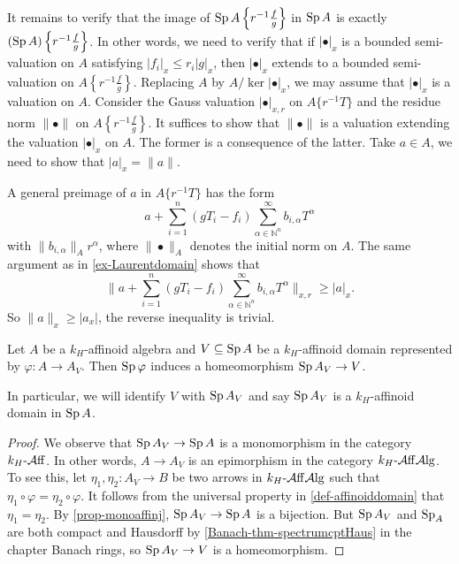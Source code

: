 \begin{example}
    It remains to verify that the image of $\operatorname{Sp} A\left\{r^{-1}\frac{f}{g}\right\}$ in $\operatorname{Sp} A$ is exactly $(\operatorname{Sp} A)\left\{r^{-1}\frac{f}{g}\right\}$. In other words, we need to verify that if $|\bullet|_x$ is a bounded semi-valuation on $A$ satisfying $|f_i|_x\leq r_i |g|_x$, then $|\bullet|_x$ extends to a bounded semi-valuation on   $A\left\{r^{-1}\frac{f}{g}\right\}$. 
    Replacing $A$ by $A/\ker |\bullet|_x$, we may assume that $|\bullet|_x$ is a valuation on $A$. Consider the Gauss valuation $|\bullet|_{x,r}$ on $A\{r^{-1}T\}$ and the residue norm $\|\bullet\|$ on $A\left\{r^{-1}\frac{f}{g}\right\}$. It suffices to show that $\|\bullet\|$ is a valuation extending the valuation $|\bullet|_x$ on $A$. The former is a consequence of the latter. Take $a\in A$, we need to show that $|a|_x=\|a\|$.

    A general preimage of $a$ in $A\{r^{-1}T\}$ has the form
    \[
        a+\sum_{i=1}^n(gT_i-f_i)\sum_{\alpha\in \mathbb{N}^n}^{\infty}b_{i,\alpha}T^{\alpha}
    \]
    with $\|b_{i,\alpha}\|_Ar^{\alpha}$, where $\|\bullet\|_A$ denotes the initial norm on $A$. The same argument as in \cref{ex-Laurentdomain} shows that 
    \[
        \|a+\sum_{i=1}^n(gT_i-f_i)\sum_{\alpha\in \mathbb{N}^n}^{\infty}b_{i,\alpha}T^{\alpha}\|_{x,r}\geq |a|_x.
    \]
    So $\|a\|_x\geq |a_x|$, the reverse inequality is trivial. 
\end{example}




\begin{proposition}\label{prop-affdomainhoemo}
    Let $A$ be a $k_H$-affinoid algebra and $V\subseteq \operatorname{Sp} A$ be a $k_H$-affinoid domain represented by $\varphi:A\rightarrow A_V$. Then $\operatorname{Sp} \varphi$ induces a homeomorphism $\operatorname{Sp} A_V\rightarrow V$. 
\end{proposition}
In particular, we will identify $V$ with $\operatorname{Sp} A_V$ and say $\operatorname{Sp} A_V$ is a $k_H$-affinoid domain in $\operatorname{Sp} A$.
\begin{proof}
    We observe that $\operatorname{Sp} A_V\rightarrow \operatorname{Sp} A$ is a monomorphism in the category $k_H\text{-}\mathcal{A}\mathrm{ff}$. In other words, $A\rightarrow A_V$ is an epimorphism in the category $k_H\text{-}\mathcal{A}\mathrm{ff}\mathcal{A}\mathrm{lg}$. To see this, let $\eta_1,\eta_2:A_V\rightarrow B$ be two arrows in $k_H\text{-}\mathcal{A}\mathrm{ff}\mathcal{A}\mathrm{lg}$ such that $\eta_1\circ \varphi=\eta_2\circ \varphi$. It follows from the universal property in \cref{def-affinoiddomain} that $\eta_1=\eta_2$. By \cref{prop-monoaffinj}, $\operatorname{Sp} A_V\rightarrow \operatorname{Sp} A$ is a bijection. But $\operatorname{Sp} A_V$ and $\operatorname{Sp}_A$ are both compact and Hausdorff by \cref{Banach-thm-spectrumcptHaus} in the chapter Banach rings, so $\operatorname{Sp} A_V\rightarrow V$ is a homeomorphism.
\end{proof}

